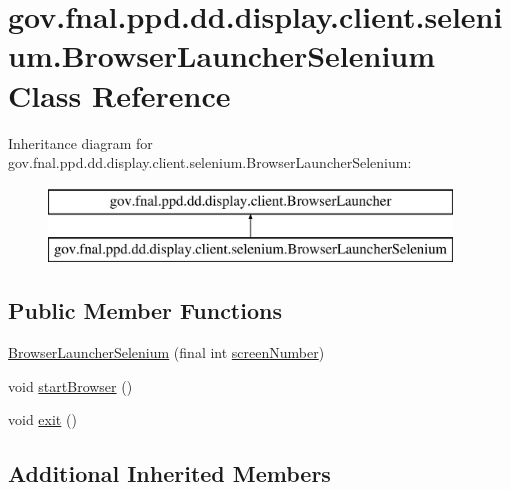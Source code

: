 \hypertarget{classgov_1_1fnal_1_1ppd_1_1dd_1_1display_1_1client_1_1selenium_1_1BrowserLauncherSelenium}{\section{gov.\-fnal.\-ppd.\-dd.\-display.\-client.\-selenium.\-Browser\-Launcher\-Selenium Class Reference}
\label{classgov_1_1fnal_1_1ppd_1_1dd_1_1display_1_1client_1_1selenium_1_1BrowserLauncherSelenium}
}
Inheritance diagram for gov.\-fnal.\-ppd.\-dd.\-display.\-client.\-selenium.\-Browser\-Launcher\-Selenium\-:\begin{figure}[H]
\begin{center}
\leavevmode
\includegraphics[height=2.000000cm]{classgov_1_1fnal_1_1ppd_1_1dd_1_1display_1_1client_1_1selenium_1_1BrowserLauncherSelenium}
\end{center}
\end{figure}
\subsection*{Public Member Functions}
\begin{DoxyCompactItemize}
\item 
\hyperlink{classgov_1_1fnal_1_1ppd_1_1dd_1_1display_1_1client_1_1selenium_1_1BrowserLauncherSelenium_a6dba4c570a0e2fa5d76634651bfcdc4c}{Browser\-Launcher\-Selenium} (final int \hyperlink{classgov_1_1fnal_1_1ppd_1_1dd_1_1display_1_1client_1_1BrowserLauncher_aa30aa801b0b7b60138f39610c4e2f211}{screen\-Number})
\item 
void \hyperlink{classgov_1_1fnal_1_1ppd_1_1dd_1_1display_1_1client_1_1selenium_1_1BrowserLauncherSelenium_ae5cf136a72446c0de67d0681f6f3f773}{start\-Browser} ()
\item 
void \hyperlink{classgov_1_1fnal_1_1ppd_1_1dd_1_1display_1_1client_1_1selenium_1_1BrowserLauncherSelenium_a6cff25c796ef423461240029f69a57ad}{exit} ()
\end{DoxyCompactItemize}
\subsection*{Additional Inherited Members}


